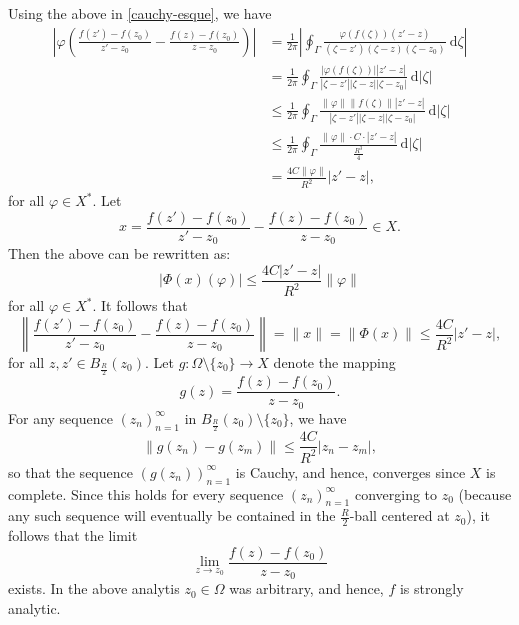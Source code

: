 \documentclass[11pt]{article}
\theoremstyle{thmstyle}
\theoremstyle{defstyle}
\renewcommand{\le}{\leqslant}
\begin{document}
Using the above in \eqref{cauchy-esque}, we have 
\begin{align*}
    \left|\varphi\left(\frac{f(z') - f(z_0)}{z' - z_0} - \frac{f(z) - f(z_0)}{z - z_0}\right)\right| &= \frac{1}{2\pi}\left|\oint_{\Gamma}\frac{\varphi(f(\zeta))(z' - z)}{(\zeta - z')(\zeta - z)(\zeta - z_0)}~\mathrm d\zeta\right|\\
    &= \frac{1}{2\pi}\oint_\Gamma\frac{|\varphi(f(\zeta))| |z' - z|}{|\zeta - z'||\zeta - z||\zeta - z_0|}~\mathrm d|\zeta|\\
    &\le \frac{1}{2\pi}\oint_\Gamma\frac{\|\varphi\|\|f(\zeta)\| |z' - z|}{|\zeta - z'||\zeta - z||\zeta - z_0|}~\mathrm d|\zeta|\\
    &\le\frac{1}{2\pi}\oint_\Gamma\frac{\|\varphi\|\cdot C\cdot |z' - z|}{\frac{R^3}{4}}~\mathrm d|\zeta|\\
    &=\frac{4C\|\varphi\|}{R^2}|z' - z|,
\end{align*}
for all $\varphi\in X^\ast$.
Let
\begin{equation*}
    x = \frac{f(z') - f(z_0)}{z' - z_0} - \frac{f(z) - f(z_0)}{z - z_0}\in X.
\end{equation*}
Then the above can be rewritten as: 
\begin{equation*}
    \left|\Phi(x)(\varphi)\right|\le\frac{4C|z' - z|}{R^2}\|\varphi\|
\end{equation*}
for all $\varphi\in X^\ast$. It follows that 
\begin{equation*}
    \left\|\frac{f(z') - f(z_0)}{z' - z_0} - \frac{f(z) - f(z_0)}{z - z_0}\right\| = \|x\| = \|\Phi(x)\|\le\frac{4C}{R^2}|z' - z|,
\end{equation*}
for all $z, z'\in B_{\frac{R}{2}}(z_0)$. Let $g\colon \Omega\setminus\{z_0\}\to X$ denote the mapping 
\begin{equation*}
    g(z) = \frac{f(z) - f(z_0)}{z - z_0}.
\end{equation*}
For any sequence $(z_n)_{n = 1}^\infty$ in $B_{\frac{R}{2}}(z_0)\setminus\{z_0\}$, we have 
\begin{equation*}
    \|g(z_n) - g(z_m)\|\le\frac{4C}{R^2}|z_n - z_m|,
\end{equation*}
so that the sequence $\left(g(z_n)\right)_{n = 1}^\infty$ is Cauchy, and hence, converges since $X$ is complete. Since this holds for every sequence $(z_n)_{n = 1}^\infty$ converging to $z_0$ (because any such sequence will eventually be contained in the $\frac R2$-ball centered at $z_0$), it follows that the limit 
\begin{equation*}
    \lim_{z\to z_0}\frac{f(z) - f(z_0)}{z - z_0}
\end{equation*}
exists. In the above analytis $z_0\in\Omega$ was arbitrary, and hence, $f$ is strongly analytic.
\end{document}
